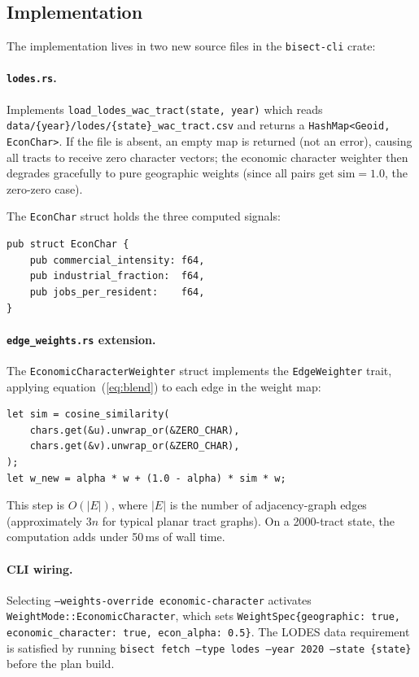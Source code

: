 \subsection{Implementation}

The implementation lives in two new source files in the \texttt{bisect-cli} crate:

\paragraph{\texttt{lodes.rs}.}
Implements \texttt{load\_lodes\_wac\_tract(state, year)} which reads
\texttt{data/\{year\}/lodes/\{state\}\_wac\_tract.csv} and returns a
\texttt{HashMap<Geoid, EconChar>}.
If the file is absent, an empty map is returned (not an error), causing all
tracts to receive zero character vectors; the economic character weighter
then degrades gracefully to pure geographic weights (since all pairs get
$\mathrm{sim} = 1.0$, the zero-zero case).

The \texttt{EconChar} struct holds the three computed signals:
\begin{verbatim}
pub struct EconChar {
    pub commercial_intensity: f64,
    pub industrial_fraction:  f64,
    pub jobs_per_resident:    f64,
}
\end{verbatim}

\paragraph{\texttt{edge\_weights.rs} extension.}
The \texttt{EconomicCharacterWeighter} struct implements the \texttt{EdgeWeighter}
trait, applying equation~(\ref{eq:blend}) to each edge in the weight map:
\begin{verbatim}
let sim = cosine_similarity(
    chars.get(&u).unwrap_or(&ZERO_CHAR),
    chars.get(&v).unwrap_or(&ZERO_CHAR),
);
let w_new = alpha * w + (1.0 - alpha) * sim * w;
\end{verbatim}
This step is $O(|E|)$, where $|E|$ is the number of adjacency-graph edges
(approximately $3n$ for typical planar tract graphs).
On a 2000-tract state, the computation adds under 50\,ms of wall time.

\paragraph{CLI wiring.}
Selecting \texttt{--weights-override economic-character} activates
\texttt{WeightMode::EconomicCharacter}, which sets \texttt{WeightSpec\{geographic: true, economic\_character: true, econ\_alpha: 0.5\}}.
The LODES data requirement is satisfied by running
\texttt{bisect fetch --type lodes --year 2020 --state \{state\}} before the plan build.

